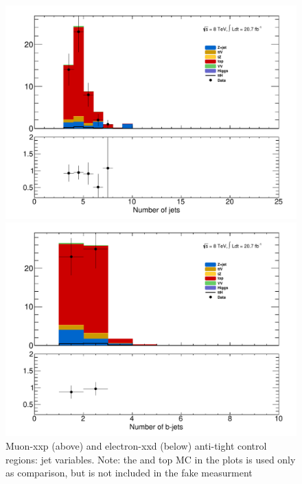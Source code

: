 \begin{figure}[!htbp]
\begin{minipage}[h]{0.5\textwidth}
    \centering \includegraphics[width=\textwidth]{figs/fake/cr_d1_NJet}
  \end{minipage}\hfill
  \begin{minipage}[h]{0.5\textwidth}
    \centering \includegraphics[width=\textwidth]{figs/fake/cr_d1_NJetBTag}
  \end{minipage}\hfill

  
  \caption{Muon-xxp (above) and electron-xxd (below) anti-tight control regions: jet variables. Note: the \ttbar and top MC in the plots is used only as comparison, but is not included
  in the fake measurment}
  \label{figure:background_3lcr}
  \end{figure} 

